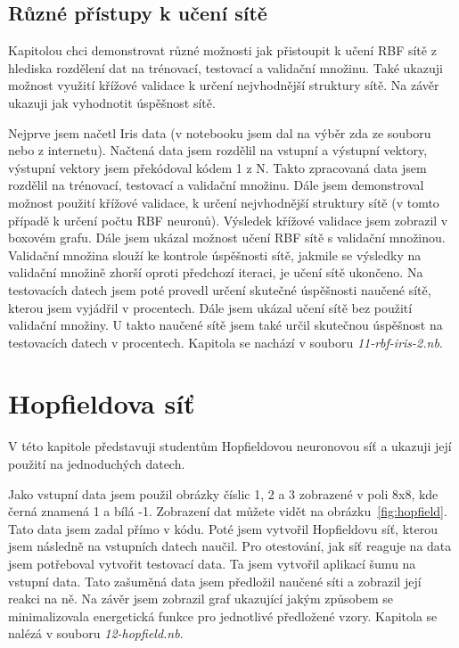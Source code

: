 \documentclass[11pt,twoside,a4paper]{book}
\begin{document}
\subsection{Různé přístupy k učení sítě}
Kapitolou chci demonstrovat různé možnosti jak přistoupit k učení RBF sítě z hlediska rozdělení dat na trénovací, testovací a validační množinu. Také ukazuji možnost využití křížové validace k určení nejvhodnější struktury sítě. Na závěr ukazuji jak vyhodnotit úspěšnost sítě.

Nejprve jsem načetl Iris data (v notebooku jsem dal na výběr zda  ze souboru nebo z internetu). Načtená data jsem rozdělil na vstupní a výstupní vektory, výstupní vektory jsem překódoval kódem 1 z N. Takto zpracovaná data jsem rozdělil na trénovací, testovací a validační množinu. Dále jsem demonstroval možnost použití křížové validace, k určení nejvhodnější struktury sítě (v tomto případě k určení počtu RBF neuronů). Výsledek křížové validace jsem zobrazil v boxovém grafu. Dále jsem ukázal možnost učení RBF sítě s validační množinou. Validační množina slouží ke kontrole úspěšnosti sítě, jakmile se výsledky na validační množině zhorší oproti předchozí iteraci, je učení sítě ukončeno. Na testovacích datech jsem poté provedl určení skutečné úspěšnosti naučené sítě, kterou jsem vyjádřil v procentech. Dále jsem ukázal učení sítě bez použití validační množiny. U takto naučené sítě jsem také určil skutečnou úspěšnost na testovacích datech v procentech. Kapitola se nachází v souboru \textit{11-rbf-iris-2.nb}.
\section{Hopfieldova síť}
V této kapitole představuji studentům Hopfieldovou neuronovou síť a ukazuji její použití na jednoduchých datech.

Jako vstupní data jsem použil obrázky číslic 1, 2 a 3 zobrazené v poli 8x8, kde černá znamená 1 a bílá -1. Zobrazení dat můžete vidět na obrázku~\ref{fig:hopfield}. Tato data jsem zadal přímo v kódu. Poté jsem vytvořil Hopfieldovu síť, kterou jsem následně na vstupních datech naučil. Pro otestování, jak síť reaguje na data jsem potřeboval vytvořit testovací data. Ta jsem vytvořil aplikací šumu na vstupní data. Tato zašuměná data jsem předložil naučené síti a zobrazil její reakci na ně. Na závěr jsem zobrazil graf ukazující jakým způsobem se minimalizovala energetická funkce pro jednotlivé předložené vzory. Kapitola se nalézá v souboru \textit{12-hopfield.nb}.
\end{document}

